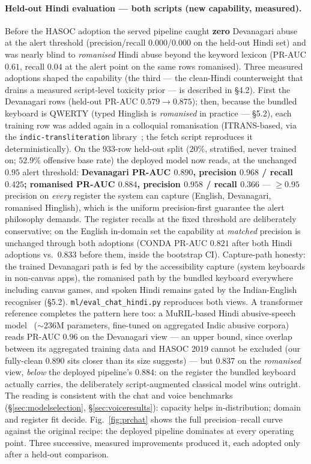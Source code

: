 \documentclass[11pt,a4paper]{article}
\begin{document}
\paragraph{Held-out Hindi evaluation --- both scripts (new capability, measured).}
Before the HASOC adoption the served pipeline caught \textbf{zero} Devanagari
abuse at the alert threshold (precision/recall $0.000$/$0.000$ on the held-out
Hindi set) and was nearly blind to \emph{romanised} Hindi abuse beyond the
keyword lexicon (PR-AUC $0.61$, recall $0.04$ at the alert point on the same
rows romanised). Three measured adoptions shaped the capability (the third ---
the clean-Hindi counterweight that drains a measured script-level toxicity
prior --- is described in \S4.2). First the
Devanagari rows (held-out PR-AUC $0.579 \rightarrow 0.875$); then, because the
bundled keyboard is QWERTY (typed Hinglish is \emph{romanised} in practice ---
\S5.2), each training row was added again in a colloquial romanisation
(ITRANS-based, via the \texttt{indic-transliteration}
library~\cite{indictrans}; the fetch script reproduces it deterministically). On the
$933$-row held-out split ($20\%$, stratified, never trained on; $52.9\%$
offensive base rate) the deployed model now reads, at the unchanged $0.95$
alert threshold: \textbf{Devanagari PR-AUC $0.890$, precision $0.968$ / recall
$0.425$; romanised PR-AUC $0.884$, precision $0.958$ / recall $0.366$} ---
$\geq$$0.95$ precision on \emph{every} register the system can capture
(English, Devanagari, romanised Hinglish), which is the uniform precision-first
guarantee the alert philosophy demands. The register recalls at the fixed
threshold are deliberately conservative; on the English in-domain set the
capability at \emph{matched} precision is unchanged through both adoptions
(CONDA PR-AUC $0.821$ after both Hindi adoptions vs.\ $0.833$ before them, inside
the bootstrap CI). Capture-path
honesty: the trained Devanagari path is fed by the accessibility capture
(system keyboards in non-canvas apps), the romanised path by the bundled
keyboard everywhere including canvas games, and spoken Hindi remains gated by
the Indian-English recogniser (\S5.2). \texttt{ml/eval\_chat\_hindi.py}
reproduces both views. A transformer reference completes the pattern here too: a
MuRIL-based Hindi abusive-speech model~\cite{das2022} ($\sim$236M parameters,
fine-tuned on aggregated Indic abusive corpora) reads PR-AUC $0.96$ on the
Devanagari view --- an upper bound, since overlap between its aggregated
training data and HASOC 2019 cannot be excluded (our fully-clean $0.890$ sits
closer than its size suggests) --- but $0.837$ on the
\emph{romanised} view, \emph{below} the deployed pipeline's $0.884$: on the
register the bundled keyboard actually carries, the deliberately
script-augmented classical model wins outright. The reading is consistent with
the chat and voice benchmarks (\S\ref{sec:modelselection},
\S\ref{sec:voiceresults}): capacity helps in-distribution; domain and register
fit decide.
Fig.~\ref{fig:prchat} shows the full precision--recall curve against the original
recipe: the deployed pipeline dominates at every operating point.
Three successive, measured improvements produced it, each adopted
only after a held-out comparison.
\end{document}
